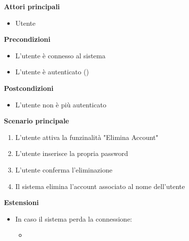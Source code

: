 \documentclass[a4paper,10pt]{article}
\begin{document}
    \textbf{Attori principali}
    \begin{itemize}
        \item Utente
    \end{itemize}
    \textbf{Precondizioni}
    \begin{itemize}
        \item L'utente è connesso al sistema
        \item L'utente è autenticato ()
    \end{itemize}
    \textbf{Postcondizioni}
    \begin{itemize}
        \item L'utente non è più autenticato
    \end{itemize}
    \textbf{Scenario principale}
    \begin{enumerate}
        \item L'utente attiva la funzinalità "Elimina Account"
        \item L'utente inserisce la propria password
        \item L'utente conferma l'eliminazione
        \item Il sistema elimina l'account associato al nome dell'utente
    \end{enumerate}
    \textbf{Estensioni}
    \begin{itemize}
        \item In caso il sistema perda la connessione:
        \begin{itemize}
            \item {}
        \end{itemize}
    \end{itemize}
\end{document}
